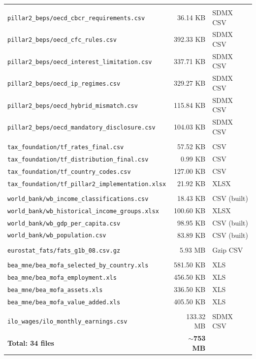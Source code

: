 \documentclass[12pt,a4paper]{article}
\begin{document}
\begin{longtable}{p{6.5cm}rp{3cm}}
\addlinespace
\multicolumn{3}{l}{\textit{OECD BEPS}} \\
\texttt{pillar2\_beps/oecd\_cbcr\_requirements.csv} & 36.14 KB & SDMX CSV \\
\texttt{pillar2\_beps/oecd\_cfc\_rules.csv} & 392.33 KB & SDMX CSV \\
\texttt{pillar2\_beps/oecd\_interest\_limitation.csv} & 337.71 KB & SDMX CSV \\
\texttt{pillar2\_beps/oecd\_ip\_regimes.csv} & 329.27 KB & SDMX CSV \\
\texttt{pillar2\_beps/oecd\_hybrid\_mismatch.csv} & 115.84 KB & SDMX CSV \\
\texttt{pillar2\_beps/oecd\_mandatory\_disclosure.csv} & 104.03 KB & SDMX CSV \\
\addlinespace
\multicolumn{3}{l}{\textit{Tax Foundation}} \\
\texttt{tax\_foundation/tf\_rates\_final.csv} & 57.52 KB & CSV \\
\texttt{tax\_foundation/tf\_distribution\_final.csv} & 0.99 KB & CSV \\
\texttt{tax\_foundation/tf\_country\_codes.csv} & 127.00 KB & CSV \\
\texttt{tax\_foundation/tf\_pillar2\_implementation.xlsx} & 21.92 KB & XLSX \\
\addlinespace
\multicolumn{3}{l}{\textit{World Bank}} \\
\texttt{world\_bank/wb\_income\_classifications.csv} & 18.43 KB & CSV (built) \\
\texttt{world\_bank/wb\_historical\_income\_groups.xlsx} & 100.60 KB & XLSX \\
\texttt{world\_bank/wb\_gdp\_per\_capita.csv} & 98.95 KB & CSV (built) \\
\texttt{world\_bank/wb\_population.csv} & 83.89 KB & CSV (built) \\
\addlinespace
\multicolumn{3}{l}{\textit{Eurostat}} \\
\texttt{eurostat\_fats/fats\_g1b\_08.csv.gz} & 5.93 MB & Gzip CSV \\
\addlinespace
\multicolumn{3}{l}{\textit{BEA}} \\
\texttt{bea\_mne/bea\_mofa\_selected\_by\_country.xls} & 581.50 KB & XLS \\
\texttt{bea\_mne/bea\_mofa\_employment.xls} & 456.50 KB & XLS \\
\texttt{bea\_mne/bea\_mofa\_assets.xls} & 336.50 KB & XLS \\
\texttt{bea\_mne/bea\_mofa\_value\_added.xls} & 405.50 KB & XLS \\
\addlinespace
\multicolumn{3}{l}{\textit{ILO}} \\
\texttt{ilo\_wages/ilo\_monthly\_earnings.csv} & 133.32 MB & SDMX CSV \\
\addlinespace
\midrule
\textbf{Total: 34 files} & \textbf{$\sim$753 MB} & \\
\end{longtable}
\end{document}
